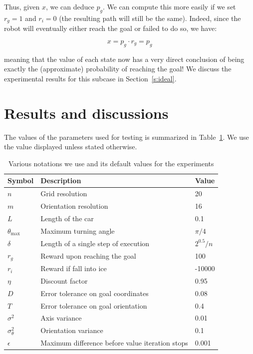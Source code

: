 \documentclass[10pt,a4paper,oneside]{article}
\begin{document}
Thus, given $x$, we can deduce $p_g$. We can compute this more easily if we
set $r_g = 1$ and $r_i = 0$ (the resulting path will still be the same).
Indeed, since the robot will eventually either reach the goal or failed to
do so, we have:

$$x = p_g \cdot r_g = p_g$$

meaning that the value of each state now has a very direct conclusion of
being exactly the (approximate) probability of reaching the goal!
We discuss the experimental results for this subcase in Section~\ref{s:ideal}.

\section{Results and discussions}

The values of the parameters used for testing is summarized in Table~\ref{tab:notations}.
We use the value displayed unless stated otherwise.

\begin{table}
\begin{center}
\begin{tabular}{|  l | l | l | }
\hline
  \textbf{Symbol} & \textbf{Description} & \textbf{Value} \\ \hline \hline
  $n$ & Grid resolution & 20 \\ \hline
  $m$ & Orientation resolution & 16 \\ \hline
  $L$ & Length of the car & 0.1 \\ \hline
  $\theta_{\text{max}}$ & Maximum turning angle & $\pi / 4$ \\ \hline
  $\delta$ & Length of a single step of execution & $2^{0.5} / n$ \\ \hline
  $r_g$ & Reward upon reaching the goal & 100 \\ \hline
  $r_i$ & Reward if fall into ice & -10000 \\ \hline
  $\eta$ & Discount factor & 0.95 \\ \hline
  $D$ & Error tolerance on goal coordinates & 0.08 \\ \hline
  $T$ & Error tolerance on goal orientation & 0.4 \\ \hline
  $\sigma^2$ & Axis variance & 0.01 \\ \hline
  $\sigma_\theta^2$ & Orientation variance & 0.1 \\ \hline
  $\epsilon$ & Maximum difference before value iteration stops & 0.001 \\ \hline
\end{tabular}
\end{center}
\caption{Various notations we use and its default values for the experiments}
\label{tab:notations}
\end{table}
\end{document}
